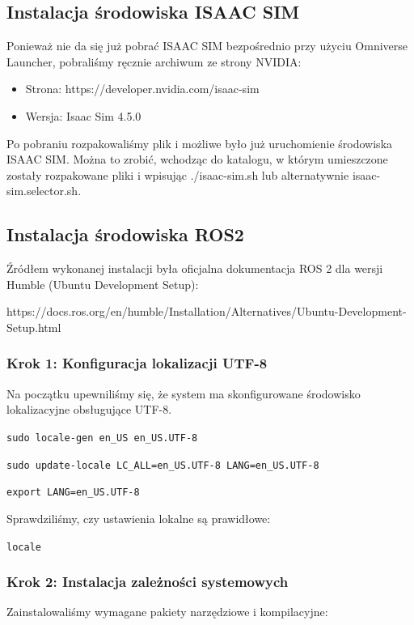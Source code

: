 \documentclass[12pt]{article}
\begin{document}
\subsection{Instalacja środowiska ISAAC SIM}

Ponieważ nie da się już pobrać ISAAC SIM bezpośrednio przy użyciu Omniverse Launcher, pobraliśmy ręcznie archiwum ze strony NVIDIA:

\begin{itemize}
    \item Strona: https://developer.nvidia.com/isaac-sim
    \item Wersja: Isaac Sim 4.5.0
\end{itemize}

Po pobraniu rozpakowaliśmy plik i możliwe było już uruchomienie środowiska ISAAC SIM. Można to zrobić, wchodząc do katalogu, w którym umieszczone zostały rozpakowane pliki i wpisując ./isaac-sim.sh lub alternatywnie isaac-sim.selector.sh.

 

\subsection{Instalacja środowiska ROS2}

Źródłem wykonanej instalacji była oficjalna dokumentacja ROS 2 dla wersji Humble (Ubuntu Development Setup):

 https://docs.ros.org/en/humble/Installation/Alternatives/Ubuntu-Development-Setup.html


\subsubsection{Krok 1: Konfiguracja lokalizacji UTF-8}
Na początku upewniliśmy się, że system ma skonfigurowane środowisko lokalizacyjne obsługujące UTF-8.


\texttt{sudo locale-gen en\_US en\_US.UTF-8}

\texttt{sudo update-locale LC\_ALL=en\_US.UTF-8 LANG=en\_US.UTF-8}

\texttt{export LANG=en\_US.UTF-8}

Sprawdziliśmy, czy ustawienia lokalne są prawidłowe:

\texttt{locale}

\subsubsection{Krok 2: Instalacja zależności systemowych}
Zainstalowaliśmy wymagane pakiety narzędziowe i kompilacyjne:
\end{document}
